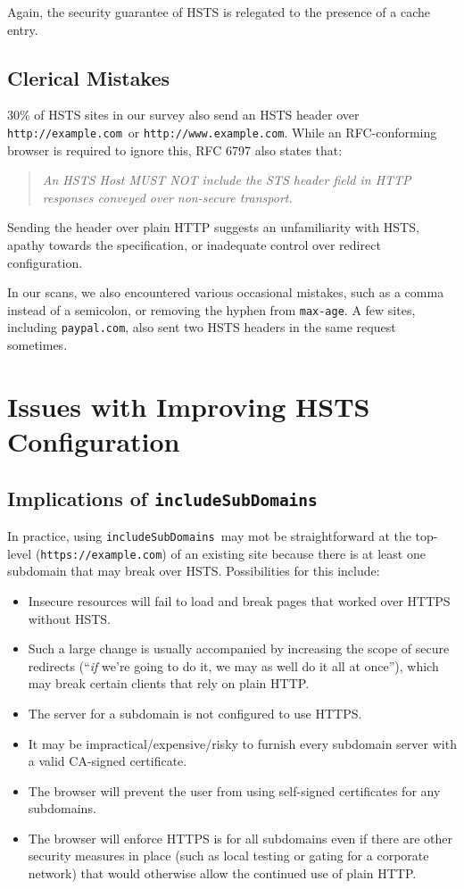 \documentclass[conference]{./IEEEtran}
\newcommand{\site}[1]{\texttt{#1}}
\newcommand{\code}[1]{\texttt{#1}}
\newcommand{\iSD}{{\code{includeSubDomains}}}
\newcommand{\genericsite}{example.com}
\newcommand{\h}{{\site{http://\genericsite}}}
\newcommand{\s}{{\site{https://\genericsite}}}
\newcommand{\hw}{{\site{http://www.\genericsite}}}
\theoremstyle{plain}
\begin{document}
Again, the security guarantee of HSTS is relegated to the presence of a cache entry.

\subsection{Clerical Mistakes}

$30\%$ of HSTS sites in our survey also send an HSTS header over \h~or \hw. While an RFC-conforming browser is required to ignore this, RFC 6797\cite{rfc} also states that:

\begin{quotation}\it
An HSTS Host MUST NOT include the STS header field in HTTP responses conveyed over non-secure transport.
\end{quotation}

Sending the header over plain HTTP suggests an unfamiliarity with HSTS, apathy towards the specification, or inadequate control over redirect configuration.

In our scans, we also encountered various occasional mistakes, such as a comma instead of a semicolon, or removing the hyphen from \code{max-age}. A few sites, including \code{paypal.com}, also sent two HSTS headers in the same request sometimes.

\section{Issues with Improving HSTS Configuration}

\subsection{Implications of \iSD}
\label{includeSubDomains-issues}

In practice, using \iSD~may mot be straightforward at the top-level (\s) of an existing site because there is at least one subdomain that may break over HSTS. Possibilities for this include:

\begin{itemize}
\item Insecure resources will fail to load and break pages that worked over HTTPS without HSTS.
\item Such a large change is usually accompanied by increasing the scope of secure redirects (``\emph{if} we're going to do it, we may as well do it all at once''), which may break certain clients that rely on plain HTTP.\item The server for a subdomain is not configured to use HTTPS.
\item It may be impractical/expensive/risky to furnish every subdomain server with a valid CA-signed certificate.
\item The browser will prevent the user from using self-signed certificates for any subdomains.
\item The browser will enforce HTTPS is for all subdomains even if there are other security measures in place (such as local testing or gating for a corporate network) that would otherwise allow the continued use of plain HTTP.
\end{itemize}
\end{document}
